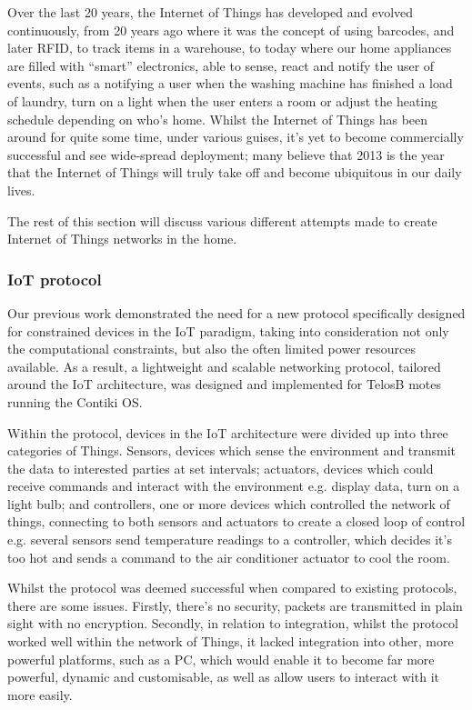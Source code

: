 Over the last 20 years, the Internet of Things has developed and evolved continuously, from 20 years ago where it was the concept of using barcodes, and later RFID\cite{K.Ashton}, to track items in a warehouse, to today where our home appliances are filled with ``smart'' electronics, able to sense, react and notify the user of events, such as a notifying a user when the washing machine has finished a load of laundry, turn on a light when the user enters a room or adjust the heating schedule depending on who's home. Whilst the Internet of Things has been around for quite some time, under various guises, it's yet to become commercially successful and see wide-spread deployment; many believe that 2013 is the year that the Internet of Things will truly take off and become ubiquitous in our daily lives\cite{2013IoT}.

The rest of this section will discuss various different attempts made to create Internet of Things networks in the home.

\subsubsection{IoT protocol} %
\label{ssub:knot}
Our previous work\cite{KNoT} demonstrated the need for a new protocol specifically designed for constrained devices in the IoT paradigm, taking into consideration not only the computational constraints, but also the often limited power resources available. As a result, a lightweight and scalable networking protocol, tailored around the IoT architecture, was designed and implemented for TelosB motes running the Contiki OS. 

Within the protocol, devices in the IoT architecture were divided up into three categories of Things. Sensors, devices which sense the environment and transmit the data to interested parties at set intervals; actuators, devices which could receive commands and interact with the environment e.g. display data, turn on a light bulb; and controllers, one or more devices which controlled the network of things, connecting to both sensors and actuators to create a closed loop of control e.g. several sensors send temperature readings to a controller, which decides it's too hot and sends a command to the air conditioner actuator to cool the room. 

Whilst the protocol was deemed successful when compared to existing protocols, there are some issues. Firstly, there's no security, packets are transmitted in plain sight with no encryption. Secondly, in relation to integration, whilst the protocol worked well within the network of Things, it lacked integration into other, more powerful platforms, such as a PC, which would enable it to become far more powerful, dynamic and customisable, as well as allow users to interact with it more easily. 

